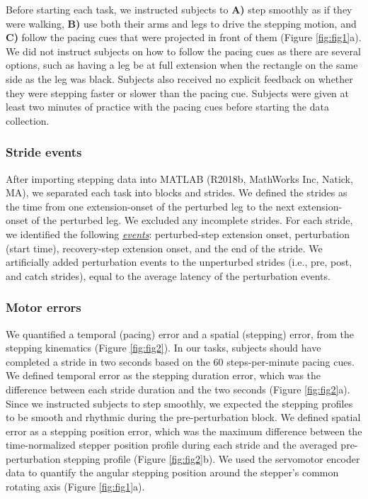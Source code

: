 \documentclass[../thesis_seyed.tex]{subfiles}
\begin{document}
Before starting each task, we instructed subjects to \textbf{A)} step smoothly as if they were walking, \textbf{B)} use both their arms and legs to drive the stepping motion, and \textbf{C)} follow the  pacing cues that were projected in front of them (Figure \ref{fig:fig1}a). We did not instruct subjects on how to follow the pacing cues as there are several options, such as having a leg be at full extension when the rectangle on the same side as the leg was black. Subjects also received no explicit feedback on whether they were stepping faster or slower than the pacing cue. Subjects were given at least two minutes of practice with the  pacing cues before starting the data collection.

\subsubsection{Stride events}
After importing stepping data into MATLAB (R2018b, MathWorks Inc, Natick, MA), we separated each task into blocks and strides. We defined the strides as the time from one extension-onset of the perturbed leg to the next extension-onset of the perturbed leg. We excluded any incomplete strides. For each stride, we identified the following \textit{\underline{events}}: perturbed-step extension onset, perturbation (start time), recovery-step extension onset, and the end of the stride. We artificially added perturbation events to the unperturbed strides (i.e., pre, post, and catch strides), equal to the average latency of the perturbation events.

\subsubsection{Motor errors}
We quantified a temporal (pacing) error and a spatial (stepping) error, from the stepping kinematics (Figure \ref{fig:fig2}). In our tasks, subjects should have completed a stride in two seconds based on the 60 steps-per-minute pacing cues. We defined temporal error as the stepping duration error, which was the difference between each stride duration and the two seconds (Figure \ref{fig:fig2}a). Since we instructed subjects to step smoothly, we expected the stepping profiles to be smooth and rhythmic during the pre-perturbation block. We defined spatial error as a stepping position error, which was the maximum difference between the time-normalized stepper position profile during each stride and the averaged pre-perturbation stepping profile (Figure \ref{fig:fig2}b). We used the servomotor encoder data to quantify the angular stepping position around the stepper's common rotating axis (Figure \ref{fig:fig1}a).
\end{document}
